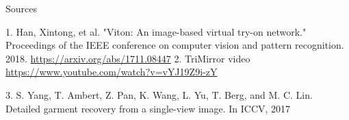 \documentclass{beamer}
\begin{document}
\begin{frame}{Sources}
\begin{thebibliography}{0}

   1. Han, Xintong, et al. "Viton: An image-based virtual try-on network." Proceedings of the IEEE conference on computer vision and pattern recognition. 2018. \url{https://arxiv.org/abs/1711.08447} 
   2. TriMirror video \url{https://www.youtube.com/watch?v=vYJ19Z9i-zY} 
  
   3. S. Yang, T. Ambert, Z. Pan, K. Wang, L. Yu, T. Berg, and M. C. Lin. Detailed garment recovery from a single-view image. In ICCV, 2017
\end{thebibliography}

\end{frame}

 
\end{document}
